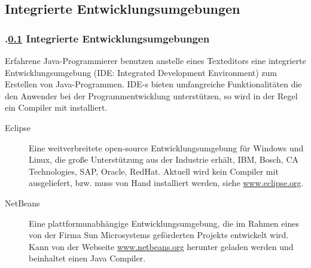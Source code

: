 \def\stitle{Integrierte Entwicklungsumgebungen}%
\subsection{\stitle}\label{S:IDE}
\begin{frame}[t]%
  \frametitle{\kap.\ref{S:IDE} \stitle}%
\medskip

{\color{red}Erfahrene Java-Programmierer} benutzen anstelle eines Texteditors eine integrierte Entwicklungsumgebung (IDE: Integrated Development Environment) zum Erstellen von Java-Programmen.
IDE-s bieten umfangreiche Funktionalit\"aten die den Anwender bei der Programmentwicklung unterst\"utzen, so wird in der Regel ein Compiler mit installiert.
\medskip

\begin{description}
  \item[Eclipse] Eine weitverbreitete open-source Entwicklungsumgebung f\"ur Windows und Linux, die gro\ss e Unterst\"utzung aus der Industrie erh\"alt, IBM, Bosch, CA Technologies, SAP, Oracle, RedHat.
    Aktuell wird kein Compiler mit ausgeliefert, bzw. muss von Hand installiert werden, siehe \textcolor{KITblue}{\url{www.eclipse.org}}.
  \item[NetBeans] Eine plattformunabh\"angige Entwicklungsumgebung, die im Rahmen eines von der Firma Sun Microsystems gef\"orderten Projekts entwickelt wird.
    Kann von der Webseite \textcolor{KITblue}{\url{www.netbeans.org}} herunter geladen werden und beinhaltet einen Java Compiler.
\end{description}
\end{frame}
